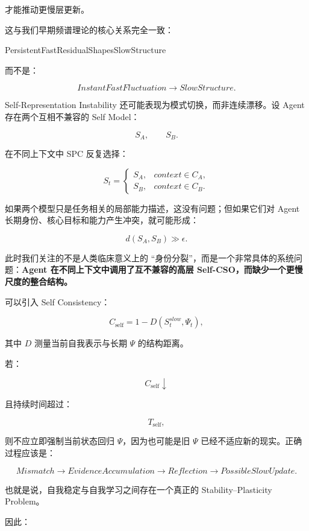 才能推动更慢层更新。

这与我们早期频谱理论的核心关系完全一致：

\begin{statementbox}
PersistentFastResidualShapesSlowStructure
\end{statementbox}

而不是：

\[
InstantFastFluctuation
\rightarrow
SlowStructure.
\]

Self-Representation Instability 还可能表现为模式切换，而非连续漂移。设 Agent 存在两个互相不兼容的 Self Model：

\[
S_A,
\qquad
S_B.
\]

在不同上下文中 SPC 反复选择：

\[
S_t
=
\begin{cases}
S_A,& context\in C_A,\\
S_B,& context\in C_B.
\end{cases}
\]

如果两个模型只是任务相关的局部能力描述，这没有问题；但如果它们对 Agent 长期身份、核心目标和能力产生冲突，就可能形成：

\[
d(S_A,S_B)\gg\epsilon.
\]

此时我们关注的不是人类临床意义上的 ``身份分裂''，而是一个非常具体的系统问题：\textbf{Agent 在不同上下文中调用了互不兼容的高层 Self-CSO，而缺少一个更慢尺度的整合结构。}

可以引入 Self Consistency：

\[
C_{\mathrm{self}}
=
1-
D(
S_t^{slow},
\Psi_t
),
\]

其中 $D$ 测量当前自我表示与长期 $\Psi$ 的结构距离。

若：

\[
C_{\mathrm{self}}\downarrow
\]

且持续时间超过：

\[
T_{\mathrm{self}},
\]

则不应立即强制当前状态回归 $\Psi$，因为也可能是旧 $\Psi$ 已经不适应新的现实。正确过程应该是：

\[
Mismatch
\rightarrow
EvidenceAccumulation
\rightarrow
Reflection
\rightarrow
PossibleSlowUpdate.
\]

也就是说，自我稳定与自我学习之间存在一个真正的 Stability--Plasticity Problem。

因此：

\begin{statementbox}
\centering
{}
\end{statementbox}

